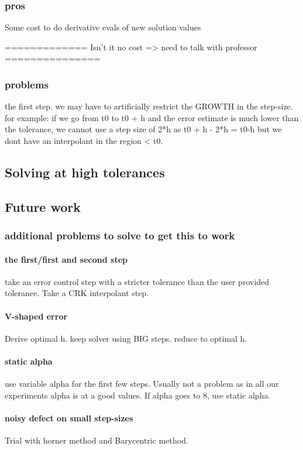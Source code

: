\documentclass{article}
\begin{document}
\subsubsection{pros}
Some cost to do derivative evals of new solution values

=============
Isn't it no cost => need to talk with professor
===============

\subsubsection{problems}
the first step. we may have to artificially restrict the GROWTH in the step-size.
for example:
if we go from t0 to t0 + h and the error estimate is much lower than the tolerance, we cannot use a step size of 2*h as t0 + h - 2*h = t0-h but we dont have an interpolant in the region < t0.

\subsection{Solving at high tolerances}

\subsection{Future work}
\subsubsection{additional problems to solve to get this to work}
\paragraph{the first/first and second step}
take an error control step with a stricter tolerance than the user provided tolerance. 
Take a CRK interpolant step.

\paragraph{V-shaped error}
Derive optimal h. keep solver using BIG steps. reduce to optimal h.

\paragraph{static alpha}
use variable alpha for the first few steps. Usually not a problem as in all our experiments alpha is at a good values.
If alpha goes to 8, use static alpha.

\paragraph{noisy defect on small step-sizes}
Trial with horner method and Barycentric method.
\end{document}
